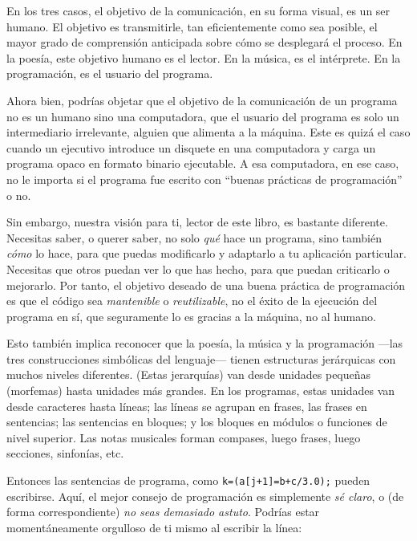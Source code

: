 \documentclass[10pt,a4paper]{book}
\begin{document}
\medskip

En los tres casos, el objetivo de la comunicación, en su forma visual, es un ser humano. El objetivo es transmitirle, tan eficientemente como sea posible, el mayor grado de comprensión anticipada sobre cómo se desplegará el proceso. En la poesía, este objetivo humano es el lector. En la música, es el intérprete. En la programación, es el usuario del programa.

\medskip

Ahora bien, podrías objetar que el objetivo de la comunicación de un programa no es un humano sino una computadora, que el usuario del programa es solo un intermediario irrelevante, alguien que alimenta a la máquina. Este es quizá el caso cuando un ejecutivo introduce un disquete en una computadora y carga un programa opaco en formato binario ejecutable. A esa computadora, en ese caso, no le importa si el programa fue escrito con “buenas prácticas de programación” o no.

\medskip

Sin embargo, nuestra visión para ti, lector de este libro, es bastante diferente. Necesitas saber, o querer saber, no solo \textit{qué} hace un programa, sino también \textit{cómo} lo hace, para que puedas modificarlo y adaptarlo a tu aplicación particular. Necesitas que otros puedan ver lo que has hecho, para que puedan criticarlo o mejorarlo. Por tanto, el objetivo deseado de una buena práctica de programación es que el código sea \textit{mantenible} o \textit{reutilizable}, no el éxito de la ejecución del programa en sí, que seguramente lo es gracias a la máquina, no al humano.

\medskip

Esto también implica reconocer que la poesía, la música y la programación —las tres construcciones simbólicas del lenguaje— tienen estructuras jerárquicas con muchos niveles diferentes. (Estas jerarquías) van desde unidades pequeñas (morfemas) hasta unidades más grandes. En los programas, estas unidades van desde caracteres hasta líneas; las líneas se agrupan en frases, las frases en sentencias; las sentencias en bloques; y los bloques en módulos o funciones de nivel superior. Las notas musicales forman compases, luego frases, luego secciones, sinfonías, etc. 

\medskip

Entonces las sentencias de programa, como \texttt{k=(a[j+1]=b+c/3.0);} pueden escribirse. Aquí, el mejor consejo de programación es simplemente \textit{sé claro}, o (de forma correspondiente) \textit{no seas demasiado astuto}. Podrías estar momentáneamente orgulloso de ti mismo al escribir la línea:
\end{document}
